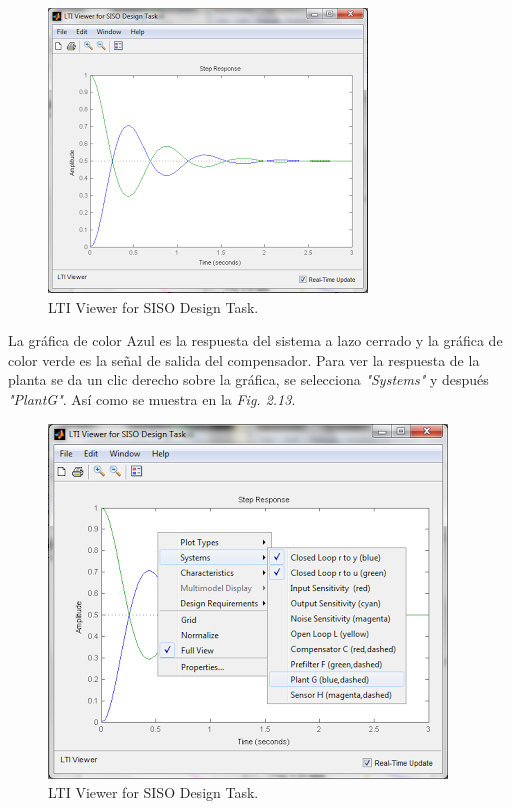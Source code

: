 \documentclass[a4paper,12pt,twoside]{proyectotanquesecci}
\begin{document}
\begin{figure}[h]
\centering
\includegraphics[scale=0.7]{Ventana6}
\renewcommand{\figurename}{Fig.}
\caption{LTI Viewer for SISO Design Task.}
\label{LTI Viewer for SISO Design Task.}
\end{figure}

La gráfica de color Azul es la respuesta del sistema a lazo cerrado y la gráfica de color verde es la señal de salida del compensador. Para ver la respuesta de la planta se da un clic derecho sobre la gráfica, se selecciona \textit{"Systems"} y después \textit{"PlantG"}. Así como se muestra en la \textit{Fig. 2.13}. \\

\begin{figure}[h]
\centering
\includegraphics[scale=0.6]{Ventana7}
\renewcommand{\figurename}{Fig.}
\caption{LTI Viewer for SISO Design Task.}
\label{LTI Viewer for SISO Design Task.}
\end{figure}
\end{document}
